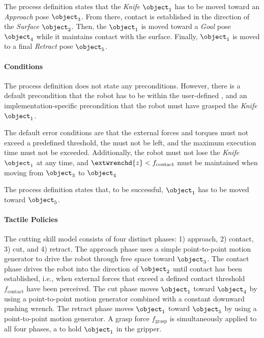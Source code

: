 The process definition states that the \textit{Knife} $\object_1$ has to be moved toward an \textit{Approach} pose $\object_3$.
From there, contact is established in the direction of the \textit{Surface} $\object_2$.
Then, the $\object_1$ is moved toward a \textit{Goal} pose $\object_4$ while it maintains contact with the surface.
Finally, $\object_1$ is moved to a final \textit{Retract} pose $\object_5$.

\paragraph{Conditions}

The process definition does not state any preconditions.
However, there is a default precondition that the robot has to be within the user-defined \roi, and an implementation-specific precondition that the robot must have grasped the \textit{Knife} $\object_1$.

The default error conditions are that the external forces and torques must not exceed a predefined threshold, the \roi{} must not be left, and the maximum execution time must not be exceeded.
Additionally, the robot must not lose the \textit{Knife} $\object_1$ at any time, and $\extwrenchd{z}<f_\text{contact}$ must be maintained when moving from $\object_3$ to $\object_4$

The process definition states that, to be successful, $\object_1$ has to be moved toward $\object_5$.

\paragraph{Tactile Policies}

The cutting skill model consists of four distinct phases: 1) approach, 2) contact, 3) cut, and 4) retract.
The approach phase uses a simple point-to-point motion generator to drive the robot through free space toward $\object_3$.
The contact phase drives the robot into the direction of $\object_2$ until contact has been established, i.e., when external forces that exceed a defined contact threshold $f_\text{contact}$ have been perceived.
The cut phase moves $\object_1$ toward $\object_4$ by using a point-to-point motion generator combined with a constant downward pushing wrench.
The retract phase moves $\object_1$ toward $\object_5$ by using a point-to-point motion generator.
A grasp force $f_\text{grasp}$ is simultaneously applied to all four phases, a to hold $\object_1$ in the gripper.